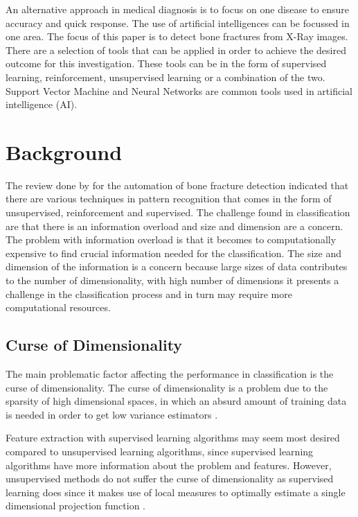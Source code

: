 \documentclass[11pt,twocolumn]{witseiepaper}
\begin{document}
	An alternative approach in medical diagnosis is to focus on one disease to ensure accuracy and quick response. The use of artificial intelligences can be focussed in one area. The focus of this paper is to detect bone fractures from X-Ray images. There are a selection of tools that can be applied in order to achieve the desired outcome for this investigation. These tools can be in the form of supervised learning, reinforcement, unsupervised learning or a combination of the two. Support Vector Machine and Neural Networks are common tools used in artificial intelligence (AI).
	
	\section{Background}
	The review done by \cite{Mahendran2011} for the automation of bone fracture detection indicated that there are various techniques in pattern recognition that comes in the form of unsupervised, reinforcement and supervised. The challenge found in classification are that there is an information overload and size and dimension are a concern. The problem with information overload is that it becomes to computationally expensive to find crucial information needed for the classification. The size and dimension of the information is a concern because large sizes of data contributes to the number of dimensionality, with high number of dimensions it presents a challenge in the classification process and in turn may require more computational resources.
	
	\subsection{Curse of Dimensionality}
	The main problematic factor affecting the performance in classification is the curse of dimensionality. The curse of dimensionality is a problem due to the sparsity of high dimensional spaces, in which an absurd amount of training data is needed in order to get low variance  estimators \cite{intrator_feature_1992}.
	
	Feature extraction with supervised learning algorithms may seem most desired compared to unsupervised learning algorithms, since supervised learning algorithms have more information about the problem and features. However, unsupervised methods do not suffer the curse of dimensionality as supervised learning does since it makes use of local measures to optimally estimate a single dimensional projection function \cite{intrator_feature_1992}.
	
\end{document}
